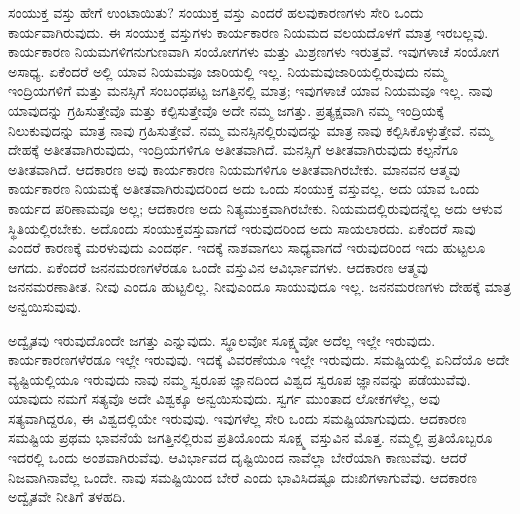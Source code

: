 ಸಂಯುಕ್ತ ವಸ್ತು ಹೇಗೆ ಉಂಟಾಯಿತು? ಸಂಯುಕ್ತ ವಸ್ತು ಎಂದರೆ ಹಲವು\break ಕಾರಣಗಳು ಸೇರಿ ಒಂದು ಕಾರ್ಯವಾಗಿರುವುದು. ಈ ಸಂಯುಕ್ತ ವಸ್ತುಗಳು ಕಾರ್ಯಕಾರಣ ನಿಯಮದ ವಲಯದೊಳಗೆ ಮಾತ್ರ ಇರಬಲ್ಲವು. ಕಾರ್ಯಕಾರಣ ನಿಯಮಗಳಿ\-ಗನುಗುಣವಾಗಿ ಸಂಯೋಗಗಳು ಮತ್ತು ಮಿಶ್ರಣಗಳು ಇರುತ್ತವೆ. ಇವುಗಳಾಚೆ ಸಂಯೋಗ ಅಸಾಧ್ಯ. ಏಕೆಂದರೆ ಅಲ್ಲಿ ಯಾವ ನಿಯಮವೂ ಜಾರಿಯಲ್ಲಿ ಇಲ್ಲ. ನಿಯಮವು\break ಜಾರಿಯಲ್ಲಿರುವುದು ನಮ್ಮ ಇಂದ್ರಿಯಗಳಿಗೆ ಮತ್ತು ಮನಸ್ಸಿಗೆ ಸಂಬಂಧಪಟ್ಟ ಜಗತ್ತಿನಲ್ಲಿ ಮಾತ್ರ; ಇವುಗಳಾಚೆ ಯಾವ ನಿಯಮವೂ ಇಲ್ಲ. ನಾವು ಯಾವುದನ್ನು ಗ್ರಹಿಸುತ್ತೇವೊ ಮತ್ತು ಕಲ್ಪಿಸುತ್ತೇವೊ ಅದೇ ನಮ್ಮ ಜಗತ್ತು. ಪ್ರತ್ಯಕ್ಷವಾಗಿ ನಮ್ಮ ಇಂದ್ರಿಯಕ್ಕೆ ನಿಲುಕುವುದನ್ನು ಮಾತ್ರ ನಾವು ಗ್ರಹಿಸುತ್ತೇವೆ. ನಮ್ಮ ಮನಸ್ಸಿನಲ್ಲಿರುವುದನ್ನು ಮಾತ್ರ ನಾವು ಕಲ್ಪಿಸಿಕೊಳ್ಳುತ್ತೇವೆ. ನಮ್ಮ ದೇಹಕ್ಕೆ ಅತೀತವಾಗಿರುವುದು, ಇಂದ್ರಿಯಗಳಿಗೂ ಅತೀತವಾಗಿದೆ. ಮನಸ್ಸಿಗೆ ಅತೀತವಾಗಿರುವುದು ಕಲ್ಪನೆಗೂ ಅತೀತವಾಗಿದೆ. ಆದಕಾರಣ ಅವು ಕಾರ್ಯಕಾರಣ ನಿಯಮಗಳಿಗೂ ಅತೀತವಾಗಿರಬೇಕು. ಮಾನವನ ಆತ್ಮವು ಕಾರ್ಯಕಾರಣ ನಿಯಮಕ್ಕೆ ಅತೀತವಾಗಿರುವುದರಿಂದ ಅದು ಒಂದು ಸಂಯುಕ್ತ ವಸ್ತುವಲ್ಲ. ಅದು ಯಾವ ಒಂದು ಕಾರ್ಯದ ಪರಿಣಾಮವೂ ಅಲ್ಲ; ಆದಕಾರಣ ಅದು ನಿತ್ಯಮುಕ್ತವಾಗಿರಬೇಕು. ನಿಯಮದಲ್ಲಿರುವುದನ್ನೆಲ್ಲ ಅದು ಆಳುವ ಸ್ಥಿತಿಯಲ್ಲಿರಬೇಕು. ಅದೊಂದು ಸಂಯುಕ್ತ\break ವಸ್ತುವಾಗದೆ ಇರುವುದರಿಂದ ಅದು ಸಾಯಲಾರದು. ಏಕೆಂದರೆ ಸಾವು ಎಂದರೆ ಕಾರಣಕ್ಕೆ ಮರಳುವುದು ಎಂದರ್ಥ. ಇದಕ್ಕೆ ನಾಶವಾಗಲು ಸಾಧ್ಯವಾಗದೆ ಇರುವುದರಿಂದ ಇದು ಹುಟ್ಟಲೂ ಆಗದು. ಏಕೆಂದರೆ ಜನನಮರಣಗಳೆರಡೂ ಒಂದೇ ವಸ್ತುವಿನ ಆವಿರ್ಭಾವಗಳು. ಆದಕಾರಣ ಆತ್ಮವು ಜನನಮರಣಾತೀತ. ನೀವು ಎಂದೂ ಹುಟ್ಟಲಿಲ್ಲ. ನೀವು\break ಎಂದೂ ಸಾಯುವುದೂ ಇಲ್ಲ. ಜನನಮರಣಗಳು ದೇಹಕ್ಕೆ ಮಾತ್ರ ಅನ್ವಯಿಸುವುವು.

ಅದ್ವೈತವು ಇರುವುದೊಂದೇ ಜಗತ್ತು ಎನ್ನುವುದು. ಸ್ಥೂಲವೋ ಸೂಕ್ಷ್ಮವೋ ಅದೆಲ್ಲ ಇಲ್ಲೇ ಇರುವುದು. ಕಾರ್ಯಕಾರಣಗಳೆರಡೂ ಇಲ್ಲೇ ಇರುವುವು. ಇದಕ್ಕೆ ವಿವರಣೆಯೂ ಇಲ್ಲೇ ಇರುವುದು. ಸಮಷ್ಟಿಯಲ್ಲಿ ಏನಿದೆಯೊ ಅದೇ ವ್ಯಷ್ಟಿಯಲ್ಲಿಯೂ ಇರುವುದು ನಾವು ನಮ್ಮ ಸ್ವರೂಪ ಜ್ಞಾನದಿಂದ ವಿಶ್ವದ ಸ್ವರೂಪ ಜ್ಞಾನವನ್ನು ಪಡೆಯುವೆವು. ಯಾವುದು ನಮಗೆ ಸತ್ಯವೊ ಅದೇ ವಿಶ್ವಕ್ಕೂ ಅನ್ವಯಿಸುವುದು. ಸ್ವರ್ಗ ಮುಂತಾದ ಲೋಕಗಳೆಲ್ಲ, ಅವು ಸತ್ಯವಾಗಿದ್ದರೂ, ಈ ವಿಶ್ವದಲ್ಲಿಯೇ ಇರುವುವು. ಇವುಗಳೆಲ್ಲ ಸೇರಿ ಒಂದು ಸಮಷ್ಟಿಯಾಗುವುದು. ಆದಕಾರಣ ಸಮಷ್ಟಿಯ ಪ್ರಥಮ ಭಾವನೆಯೆ ಜಗತ್ತಿನಲ್ಲಿರುವ ಪ್ರತಿಯೊಂದು ಸೂಕ್ಷ್ಮ ವಸ್ತುವಿನ ಮೊತ್ತ. ನಮ್ಮಲ್ಲಿ ಪ್ರತಿಯೊಬ್ಬರೂ ಇದರಲ್ಲಿ ಒಂದು ಅಂಶವಾಗಿರುವೆವು. ಆವಿರ್ಭಾವದ ದೃಷ್ಟಿಯಿಂದ ನಾವೆಲ್ಲಾ ಬೇರೆಯಾಗಿ ಕಾಣುವೆವು. ಆದರೆ ನಿಜವಾಗಿ\break ನಾವೆಲ್ಲ ಒಂದೇ. ನಾವು ಸಮಷ್ಟಿಯಿಂದ ಬೇರೆ ಎಂದು ಭಾವಿಸಿದಷ್ಟೂ ದುಃಖಿಗಳಾಗುವೆವು. ಆದಕಾರಣ ಅದ್ವೈತವೇ ನೀತಿಗೆ ತಳಹದಿ.

\vskip -0.5cm

